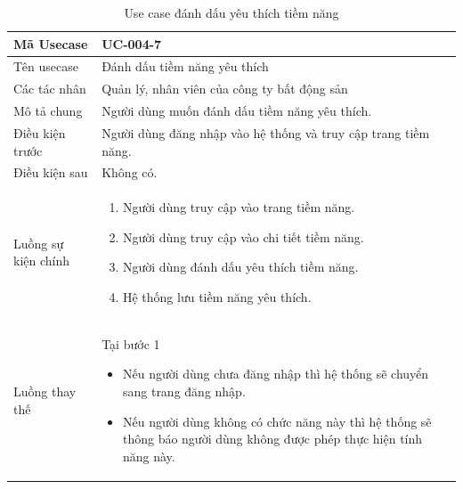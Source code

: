 \documentclass[12pt,a4paper]{article}
\begin{document}
    \begin{table}[H]
        \centering
        \begin{tabular}{|p{3.5cm}|p{11.5cm}|c|}
            \hline
            Mã Usecase      & UC-004-7                                                       \\
            \hline
            Tên usecase     & Đánh dấu tiềm năng yêu thích                                   \\
            \hline
            Các tác nhân    & Quản lý, nhân viên của công ty bất động sản                    \\
            \hline
            Mô tả chung     & Người dùng muốn đánh dấu tiềm năng yêu thích.                  \\
            \hline
            Điều kiện trước & Người dùng đăng nhập vào hệ thống và truy cập trang tiềm năng. \\
            \hline
            Điều kiện sau   & Không có.                                                      \\
            \hline
            Luồng sự kiện chính & \vspace{-.8cm}\begin{enumerate}
                                                    \item Người dùng truy cập vào trang tiềm năng.
                                                    \item Người dùng truy cập vào chi tiết tiềm năng.
                                                    \item Người dùng đánh dấu yêu thích tiềm năng.
                                                    \item Hệ thống lưu tiềm năng yêu thích.
            \end{enumerate}
            \\
            \hline
            Luồng thay thế & Tại bước 1\newline
            \vspace{-.8cm}\begin{itemize}
                              \item Nếu người dùng chưa đăng nhập thì hệ thống sẽ chuyển sang trang đăng nhập.
                              \item Nếu người dùng không có chức năng này thì hệ thống sẽ thông báo người dùng không được phép thực hiện tính năng này.
            \end{itemize}
            \\ \hline
        \end{tabular}
        \caption{Use case đánh dấu yêu thích tiềm năng}
    \end{table}
\end{document}
